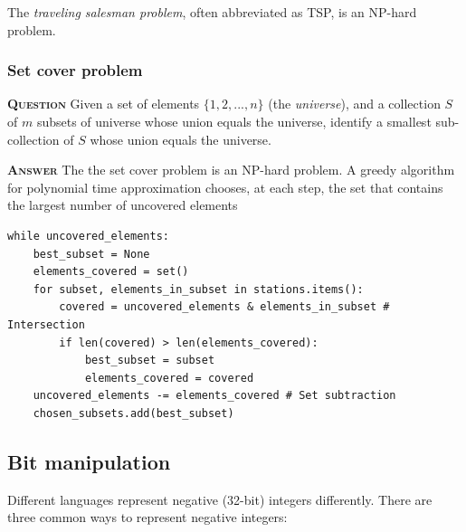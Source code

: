 \documentclass[table, xcdraw]{article}%
\begin{document}
The \emph{traveling salesman problem}, often abbreviated as TSP, is an NP-hard problem.

\subsubsection{Set cover problem}

\textsc{\textbf{Question}} Given a set of elements $\{1, 2, ..., n\}$ (the \emph{universe}), and a collection $S$ of $m$ subsets of universe whose union equals the universe, identify a smallest sub-collection of $S$ whose union equals the universe.

\textsc{\textbf{Answer}} The the set cover problem is an NP-hard problem. A greedy algorithm for polynomial time approximation chooses, at each step, the set that contains the largest number of uncovered elements

\begin{verbatim}
while uncovered_elements:
    best_subset = None
    elements_covered = set()
    for subset, elements_in_subset in stations.items():
        covered = uncovered_elements & elements_in_subset # Intersection
        if len(covered) > len(elements_covered):
            best_subset = subset
            elements_covered = covered
    uncovered_elements -= elements_covered # Set subtraction
    chosen_subsets.add(best_subset)
\end{verbatim}

\subsection{Bit manipulation}

Different languages represent negative (32-bit) integers differently. There are three common ways to represent negative integers:
\end{document}
